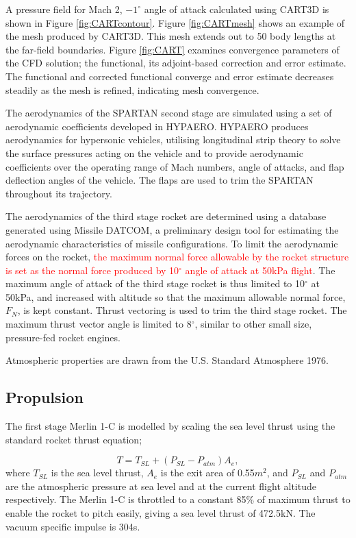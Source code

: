 \documentclass[journal]{new-aiaa}
\begin{document}
A pressure field for Mach 2, $-1^\circ$ angle of attack calculated using CART3D is shown in Figure \ref{fig:CARTcontour}. Figure \ref{fig:CARTmesh} shows an example of the mesh produced by CART3D. This mesh extends out to 50 body lengths at the far-field boundaries. Figure \ref{fig:CART} examines convergence parameters of the CFD solution; the functional, its adjoint-based correction and error estimate. The functional and corrected functional converge and error estimate decreases steadily as the mesh is refined, indicating mesh convergence.

The aerodynamics of the SPARTAN second stage are simulated using a set of aerodynamic coefficients developed in HYPAERO\cite{Jazra2009,Preller2017b}. HYPAERO produces aerodynamics for hypersonic vehicles, utilising longitudinal strip theory to solve the surface pressures acting on the vehicle and to provide aerodynamic coefficients over the operating range of Mach numbers, angle of attacks, and flap deflection angles of the vehicle. The flaps are used to trim the SPARTAN throughout its trajectory. 

The aerodynamics of the third stage rocket are determined using a database generated using Missile DATCOM\cite{Rosema2011}, a preliminary design tool for estimating the aerodynamic characteristics of missile configurations. 
To limit the aerodynamic forces on the rocket, \textcolor{red}{the maximum normal force allowable by the rocket structure is set as the normal force produced by 10$^\circ$ angle of attack at 50kPa flight}. The maximum angle of attack of the third stage rocket is thus limited to 10$^\circ$ at 50kPa, and increased with altitude so that the maximum allowable normal force, $F_N$, is kept constant. Thrust vectoring is used to trim the third stage rocket. The maximum thrust vector angle is limited to 8$^\circ$, similar to other small size, pressure-fed rocket engines\cite{Zandbergen}. 

Atmospheric properties are drawn from the U.S. Standard Atmosphere 1976\cite{Administration1976}.  
\subsection{Propulsion}
The first stage Merlin 1-C is modelled by scaling the sea level thrust using the standard rocket thrust equation;

\begin{equation}
T = T_{SL} + (P_{SL}-P_{atm}) A_e,
\end{equation}
where $T_{SL}$ is the sea level thrust, $A_e$ is the exit area of 0.55$m^2$, and $P_{SL}$ and $P_{atm}$ are the atmospheric pressure at sea level and at the current flight altitude respectively. The Merlin 1-C is throttled to a constant 85\% of maximum thrust to enable the rocket to pitch easily, giving a sea level thrust of 472.5kN\cite{Vehicle2008}. The vacuum specific impulse is 304s\cite{Vehicle2008}.
\end{document}
